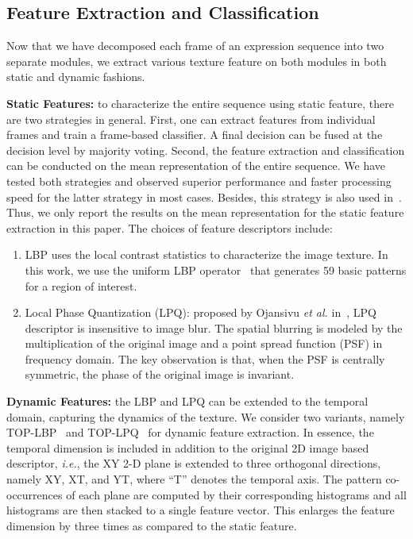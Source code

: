 \documentclass[journal]{IEEEtran}
\begin{document}
\subsection{Feature Extraction and Classification}

Now that we have decomposed each frame of an expression sequence into two separate modules, we extract various texture feature on both modules in both static and dynamic fashions. 

\textbf{Static Features:} to characterize the entire sequence using static feature, there are two strategies in general. First, one can extract features from individual frames and train a frame-based classifier. A final decision can be fused at the decision level by majority voting. Second, the feature extraction and classification can be conducted on the mean representation of the entire sequence. We have tested both strategies and observed superior performance and faster processing speed for the latter strategy in most cases. Besides, this strategy is also used in~\cite{Yang_SMCB12}. Thus, we only report the results on the mean representation for the static feature extraction in this paper. The choices of feature descriptors include:
\begin{enumerate}
\item LBP uses the local contrast statistics to characterize the image texture. In this work, we use the uniform LBP operator~\cite{Ojala_PAMI02} that generates 59 basic patterns for a region of interest.
\item Local Phase Quantization (LPQ): proposed by Ojansivu \textit{et al.} in~\cite{LPQ}, LPQ descriptor is insensitive to image blur. The spatial blurring is modeled by the multiplication of the original image and a point spread function (PSF) in frequency domain. The key observation is that, when the PSF is centrally symmetric, the phase of the original image is invariant.
\end{enumerate}

\textbf{Dynamic Features:} the LBP and LPQ can be extended to the temporal domain, capturing the dynamics of the texture. We consider two variants, namely TOP-LBP~\cite{Zhao_PAMI07} and TOP-LPQ~\cite{LPQ-TOP} for dynamic feature extraction. In essence, the temporal dimension is included in addition to the original 2D image based descriptor, \textit{i.e.}, the XY 2-D plane is extended to three orthogonal directions, namely XY, XT, and YT, where ``T'' denotes the temporal axis. The pattern co-occurrences of each plane are computed by their corresponding histograms and all histograms are then stacked to a single feature vector. This enlarges the feature dimension by three times as compared to the static feature. 
\end{document}

